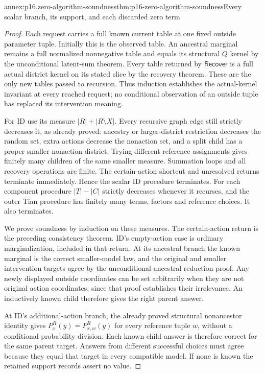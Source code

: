 \begin{annexitem}{annex:p16.zero-algorithm-soundness}{thm:p16-zero-algorithm-soundness}{Every scalar branch, its support, and each discarded zero term}
\begin{proof}
Each request carries a full known current table at one fixed
outside parameter tuple. Initially this is the observed table.
An ancestral marginal remains a full normalized nonnegative table
and equals its structural \(Q\) kernel by the unconditional
latent-sum theorem. Every table returned by \(\mathsf{Recover}\)
is a full actual district kernel on its stated slice by the
recovery theorem. These are the only new tables passed to recursion.
Thus induction establishes the actual-kernel invariant at every
reached request; no conditional observation of an outside tuple
has replaced its intervention meaning.

For ID use its measure \(|R|+|R\setminus X|\). Every
recursive graph edge still strictly decreases it, as already
proved: ancestry or larger-district restriction decreases the
random set, extra actions decrease the nonaction set, and a split
child has a proper smaller nonaction district. Trying different
reference assignments gives finitely many children of the same
smaller measure. Summation loops and all recovery operations are
finite. The certain-action shortcut and unresolved returns terminate
immediately. Hence the scalar ID procedure terminates. For each
component procedure \(|T|-|C|\) strictly decreases whenever
it recurses, and the outer Tian procedure has finitely many terms,
factors and reference choices. It also terminates.

We prove soundness by induction on these measures. The certain-action
return is the preceding consistency theorem. ID's empty-action
case is ordinary marginalization, included in that return. At its
ancestral branch the known marginal is the correct smaller-model
law, and the original and smaller intervention targets agree by
the unconditional ancestral reduction proof. Any newly displayed
outside coordinates can be set arbitrarily when they are not
original action coordinates, since that proof establishes their
irrelevance. An inductively known child therefore gives the right
parent answer.

At ID's additional-action branch, the already proved structural
nonancestor identity gives \(P^R_x(y)=P^R_{x,w}(y)\) for
every reference tuple \(w\), without a conditional probability
division. Each known child answer is therefore correct for the
same parent target. Answers from different successful choices
must agree because they equal that target in every compatible
model. If none is known the retained support records assert no value.


\end{proof}
\end{annexitem}
